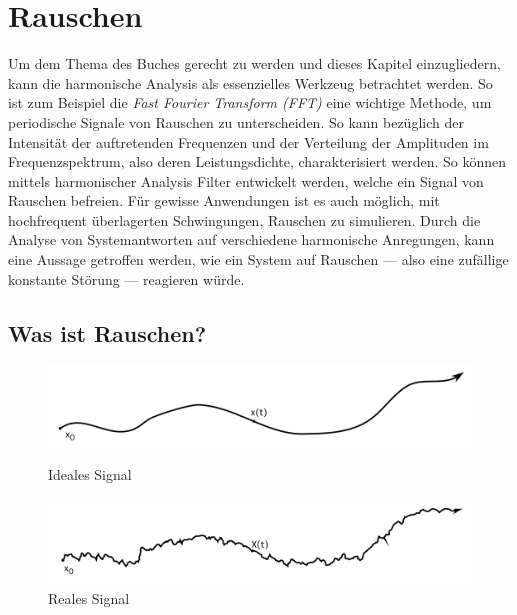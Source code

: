%
%
%
%

\section{Rauschen\label{brown:Rauschen}}

Um dem Thema des Buches gerecht zu werden und dieses Kapitel einzugliedern, kann die harmonische Analysis als essenzielles Werkzeug betrachtet werden. So ist zum Beispiel die \textit{Fast Fourier Transform (FFT)} eine wichtige Methode, um periodische Signale von Rauschen zu unterscheiden. So kann bezüglich der Intensität der auftretenden Frequenzen und der Verteilung der Amplituden im Frequenzspektrum, also deren Leistungsdichte, charakterisiert werden. 
So können mittels harmonischer Analysis Filter entwickelt werden, welche ein Signal von Rauschen befreien. Für gewisse Anwendungen ist es auch möglich, mit hochfrequent überlagerten Schwingungen, Rauschen zu simulieren. Durch die Analyse von Systemantworten auf verschiedene harmonische Anregungen, kann eine Aussage getroffen werden, wie ein System auf Rauschen --- also eine zufällige konstante Störung --- reagieren würde. 



\subsection{Was ist Rauschen?\label{brown:Rauschen:Arten}}

\begin{figure}
	\centering
	\begin{minipage}{0.45\textwidth}
		\centering
		\includegraphics[width=\textwidth]{papers/brown/images/idealSignal.png}
		\caption{Ideales Signal}
		\label{idealSignal}
	\end{minipage}
	\begin{minipage}{0.45\textwidth}
		\centering
		\includegraphics[width=\textwidth]{papers/brown/images/realSignal.png}
		\caption{Reales Signal}
		\label{realSignal}
	\end{minipage}
\end{figure}

